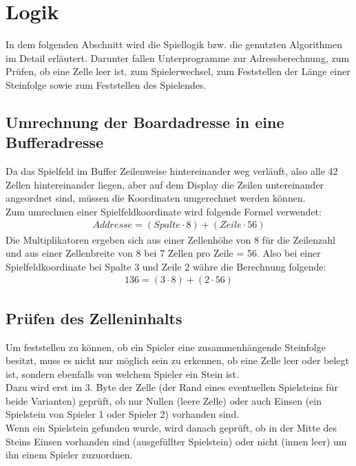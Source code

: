 \newpage
\section{Logik}
    In dem folgenden Abschnitt wird die Spiellogik bzw. die genutzten Algorithmen im Detail erläutert.
    Darunter fallen Unterprogramme zur Adressberechnung, zum Prüfen, ob eine Zelle leer ist, zum Spielerwechsel,
    zum Feststellen der Länge einer Steinfolge sowie zum Feststellen des Spielendes.

    \subsection{Umrechnung der Boardadresse in eine Bufferadresse}
        Da das Spielfeld im Buffer Zeilenweise hintereinander weg verläuft, also alle 42 Zellen hintereinander liegen,
        aber auf dem Display die Zeilen untereinander angeordnet sind, müssen die Koordinaten umgerechnet werden können.
        \\
        Zum umrechnen einer Spielfeldkoordinate wird folgende Formel verwendet:
        \begin{align}
            Addresse = (Spalte \cdot 8) + (Zeile \cdot 56)
        \end{align}
        Die Multiplikatoren ergeben sich aus einer Zellenhöhe von 8 für die Zeilenzahl und aus einer Zellenbreite von 8 bei 7 Zellen pro Zeile = 56.
        Also bei einer Spielfeldkoordinate bei Spalte 3 und Zeile 2 währe die Berechnung folgende:
        \begin{align}
            136 = (3 \cdot 8) + (2 \cdot 56) 
        \end{align}
        

    \subsection{Prüfen des Zelleninhalts}
        Um feststellen zu können, ob ein Spieler eine zusammenhängende Steinfolge besitzt,
        muss es nicht nur möglich sein zu erkennen, ob eine Zelle leer oder belegt ist,
        sondern ebenfalls von welchem Spieler ein Stein ist.
        \\
        Dazu wird erst im 3. Byte der Zelle (der Rand eines eventuellen Spielsteins für beide Varianten)
        geprüft, ob nur Nullen (leere Zelle) oder auch Einsen (ein Spielstein von Spieler 1 oder Spieler 2) vorhanden sind.
        \\
        Wenn ein Spielstein gefunden wurde,
        wird danach geprüft, ob in der Mitte des Steins Einsen vorhanden sind (ausgefüllter Spielstein) oder nicht (innen leer)
        um ihn einem Spieler zuzuordnen.

